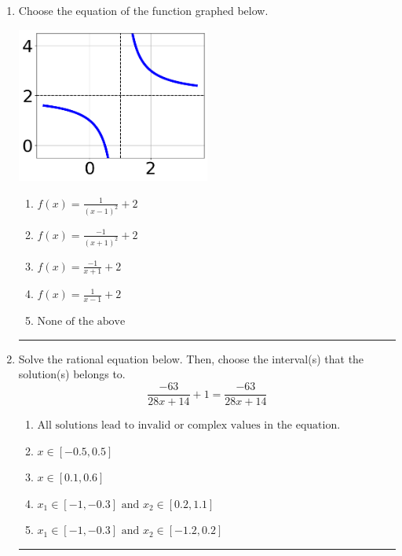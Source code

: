 \documentclass[14pt]{extbook}
\newcommand{\litem}[1]{\item#1\hspace*{-1cm}\rule{\textwidth}{0.4pt}}
\begin{document}
\begin{enumerate}
\litem{
Choose the equation of the function graphed below.
\begin{center}
    \includegraphics[width=0.5\textwidth]{../Figures/rationalGraphToEquationA.png}
\end{center}
\begin{enumerate}[label=\Alph*.]
\item \( f(x) = \frac{1}{(x - 1)^2} + 2 \)
\item \( f(x) = \frac{-1}{(x + 1)^2} + 2 \)
\item \( f(x) = \frac{-1}{x + 1} + 2 \)
\item \( f(x) = \frac{1}{x - 1} + 2 \)
\item \( \text{None of the above} \)

\end{enumerate} }
\litem{
Solve the rational equation below. Then, choose the interval(s) that the solution(s) belongs to.\[ \frac{-63}{28x + 14} + 1 = \frac{-63}{28x + 14} \]\begin{enumerate}[label=\Alph*.]
\item \( \text{All solutions lead to invalid or complex values in the equation.} \)
\item \( x \in [-0.5,0.5] \)
\item \( x \in [0.1,0.6] \)
\item \( x_1 \in [-1, -0.3] \text{ and } x_2 \in [0.2,1.1] \)
\item \( x_1 \in [-1, -0.3] \text{ and } x_2 \in [-1.2,0.2] \)


\end{enumerate}}
\end{enumerate}
\end{document}
